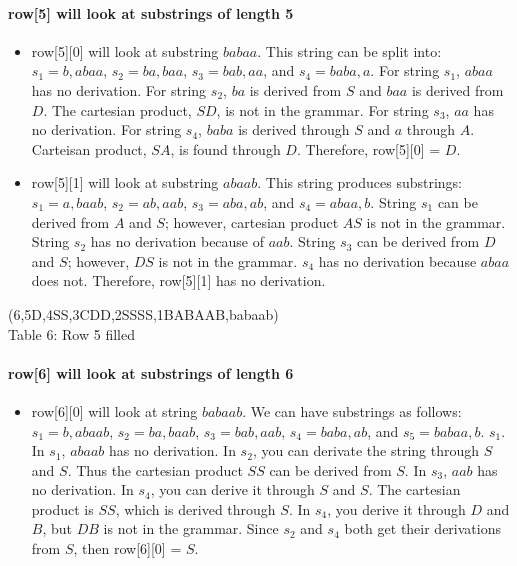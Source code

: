 \documentclass[12pt]{article}
\begin{document}
\paragraph{row[5] will look at substrings of length 5}
\begin{itemize}
    \item row[5][0] will look at substring $babaa$. This string can be split into: $s_1 = b, abaa$, $s_2 = ba, baa$, $s_3 = bab, aa$, and $s_4 = baba, a$. For string $s_1$, $abaa$ has no derivation. For string $s_2$, $ba$ is derived from $S$ and $baa$ is derived from $D$. The cartesian product, $SD$, is not in the grammar. For string $s_3$, $aa$ has no derivation. For string $s_4$, $baba$ is derived through $S$ and $a$ through $A$. Carteisan product, $SA$, is found through $D$. Therefore, row[5][0] = $D$.
    \item row[5][1] will look at substring $abaab$. This string produces substrings: $s_1 = a, baab$, $s_2 = ab, aab$, $s_3 = aba, ab$, and $s_4 = abaa, b$. String $s_1$ can be derived from $A$ and $S$; however, cartesian product $AS$ is not in the grammar. String $s_2$ has no derivation because of $aab$. String $s_3$ can be derived from $D$ and $S$; however, $DS$ is not in the grammar. $s_4$ has no derivation because $abaa$ does not. Therefore, row[5][1] has no derivation. 
\end{itemize}

\begin{center}
    \young(6\hfill,5D\emptyset,4S\emptyset S,3CDD\emptyset,2SSS\emptyset S,1BABAAB,\hfill babaab) \\
    Table 6: Row 5 filled
\end{center}

\paragraph{row[6] will look at substrings of length 6}
\begin{itemize}
    \item row[6][0] will look at string $babaab$. We can have substrings as follows: $s_1 = b, abaab$, $s_2 = ba, baab$, $s_3 = bab, aab$, $s_4 = baba, ab$, and $s_5 = babaa, b$. $s_1$. In $s_1$, $abaab$ has no derivation. In $s_2$, you can derivate the string through $S$ and $S$. Thus the cartesian product $SS$ can be derived from $S$. In $s_3$, $aab$ has no derivation. In $s_4$, you can derive it through $S$ and $S$. The cartesian product is $SS$, which is derived through $S$. In $s_4$, you derive it through $D$ and $B$, but $DB$ is not in the grammar. Since $s_2$ and $s_4$ both get their derivations from $S$, then row[6][0] = $S$. 
\end{itemize}
\end{document}
